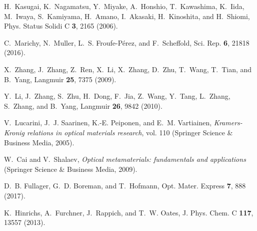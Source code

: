 \documentclass[9pt,twocolumn,twoside]{osajnl}
\begin{document}
\begin{thebibliography}{10}
	H.~Kasugai, K.~Nagamatsu, Y.~Miyake, A.~Honshio, T.~Kawashima, K.~Iida,
	M.~Iwaya, S.~Kamiyama, H.~Amano, I.~Akasaki, H.~Kinoshita, and H.~Shiomi,
	Phys. Status Solidi C \textbf{3}, 2165 (2006).
	
	C.~Marichy, N.~Muller, L.~S. Froufe-P{\'e}rez, and F.~Scheffold, Sci. Rep.
	\textbf{6}, 21818 (2016).
	
	X.~Zhang, J.~Zhang, Z.~Ren, X.~Li, X.~Zhang, D.~Zhu, T.~Wang, T.~Tian, and
	B.~Yang, Langmuir \textbf{25}, 7375 (2009).
	
	Y.~Li, J.~Zhang, S.~Zhu, H.~Dong, F.~Jia, Z.~Wang, Y.~Tang, L.~Zhang, S.~Zhang,
	and B.~Yang, Langmuir \textbf{26}, 9842 (2010).
	
	V.~Lucarini, J.~J. Saarinen, K.-E. Peiponen, and E.~M. Vartiainen,
	\emph{Kramers-Kronig relations in optical materials research}, vol. 110
	(Springer Science \& Business Media, 2005).
	
	W.~Cai and V.~Shalaev, \emph{Optical metamaterials: fundamentals and
		applications} (Springer Science \& Business Media, 2009).
	
	D.~B. Fullager, G.~D. Boreman, and T.~Hofmann, Opt. Mater. Express \textbf{7},
	888 (2017).
	
	K.~Hinrichs, A.~Furchner, J.~Rappich, and T.~W. Oates, J. Phys. Chem. C
	\textbf{117}, 13557 (2013).
	
\end{thebibliography}



 
\end{document}
